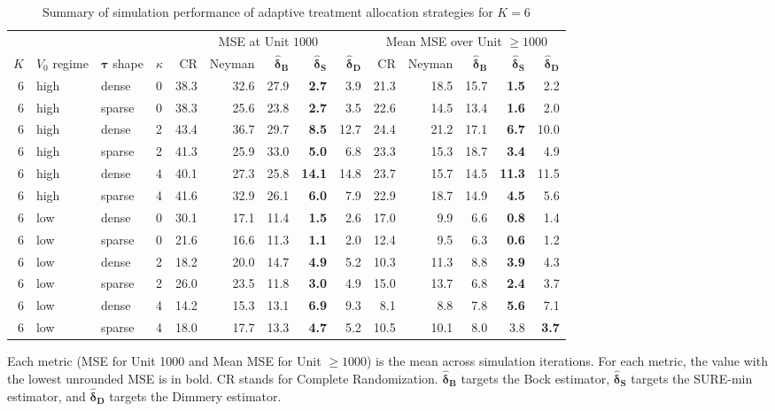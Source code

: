\documentclass{article}
\newcommand{\bstau}{\boldsymbol \tau}
\newcommand{\bsdeltad}{\boldsymbol{\hat \delta_{\textbf{D}}}}
\newcommand{\bsdeltb}{\boldsymbol {\hat \delta_B}}
\newcommand{\bsdelts}{\boldsymbol {\hat \delta_S}}
\begin{document}
\begin{table}[p]
\centering
\begin{threeparttable}
\caption{Summary of simulation performance of adaptive treatment allocation strategies for $K = 6$}
\label{tab:adaptiveSimsK6}

\small
\setlength{\tabcolsep}{4pt}

\begin{tabular}{rlll|rrrrr|rrrrr}
\toprule
 &  &  & 
& \multicolumn{5}{c}{MSE at Unit $1000$}
& \multicolumn{5}{c}{Mean MSE over Unit $\geq 1000$} \\
\cmidrule(lr){5-9} \cmidrule(lr){10-14}
$K$& $V_0$ regime & $\bstau$ shape & $\kappa$ & CR & Neyman & $\bsdeltb$ & $\bsdelts$ & $\bsdeltad$
& CR & Neyman & $\bsdeltb$ & $\bsdelts$ & $\bsdeltad$ \\
\midrule
6 & high & dense & 0 & 38.3 & 32.6 & 27.9 & \textbf{2.7} & 3.9 & 21.3 & 18.5 & 15.7 & \textbf{1.5} & 2.2\\
6 & high & sparse & 0 & 38.3 & 25.6 & 23.8 & \textbf{2.7} & 3.5 & 22.6 & 14.5 & 13.4 & \textbf{1.6} & 2.0\\
6 & high & dense & 2 & 43.4 & 36.7 & 29.7 & \textbf{8.5} & 12.7 & 24.4 & 21.2 & 17.1 & \textbf{6.7} & 10.0\\
6 & high & sparse & 2 & 41.3 & 25.9 & 33.0 & \textbf{5.0} & 6.8 & 23.3 & 15.3 & 18.7 & \textbf{3.4} & 4.9\\
6 & high & dense & 4 & 40.1 & 27.3 & 25.8 & \textbf{14.1} & 14.8 & 23.7 & 15.7 & 14.5 & \textbf{11.3} & 11.5\\
6 & high & sparse & 4 & 41.6 & 32.9 & 26.1 & \textbf{6.0} & 7.9 & 22.9 & 18.7 & 14.9 & \textbf{4.5} & 5.6\\
\midrule
6 & low & dense & 0 & 30.1 & 17.1 & 11.4 & \textbf{1.5} & 2.6 & 17.0 & 9.9 & 6.6 & \textbf{0.8} & 1.4\\
6 & low & sparse & 0 & 21.6 & 16.6 & 11.3 & \textbf{1.1} & 2.0 & 12.4 & 9.5 & 6.3 & \textbf{0.6} & 1.2\\
6 & low & dense & 2 & 18.2 & 20.0 & 14.7 & \textbf{4.9} & 5.2 & 10.3 & 11.3 & 8.8 & \textbf{3.9} & 4.3\\
6 & low & sparse & 2 & 26.0 & 23.5 & 11.8 & \textbf{3.0} & 4.9 & 15.0 & 13.7 & 6.8 & \textbf{2.4} & 3.7\\
6 & low & dense & 4 & 14.2 & 15.3 & 13.1 & \textbf{6.9} & 9.3 & 8.1 & 8.8 & 7.8 & \textbf{5.6} & 7.1\\
6 & low & sparse & 4 & 18.0 & 17.7 & 13.3 & \textbf{4.7} & 5.2 & 10.5 & 10.1 & 8.0 & 3.8 & \textbf{3.7}\\
\bottomrule
\end{tabular}

\footnotesize
Each metric (MSE for Unit 1000 and Mean MSE for Unit
$\geq 1000$) is the mean across simulation iterations.
For each metric, the value with the lowest unrounded MSE is in bold.
CR stands for Complete Randomization. $\bsdeltb$ targets the Bock estimator, $\bsdelts$ targets the SURE-min estimator, and $\bsdeltad$ targets the Dimmery estimator.

\end{threeparttable}
\end{table}
\end{document}
